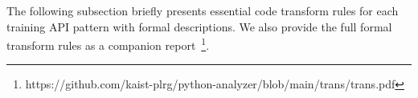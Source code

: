 %
%
The following subsection briefly presents essential code transform rules for
each training API pattern with formal descriptions. 
We also provide the full formal transform rules as a companion
report~\footnote{https://github.com/kaist-plrg/python-analyzer/blob/main/trans/trans.pdf}.

